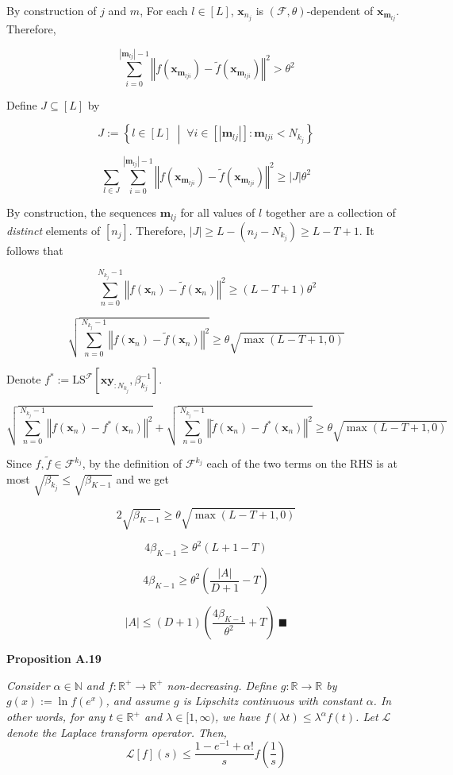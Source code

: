 \documentclass[a4paper]{article}
\newcommand{\Co}[1]{}
\newcommand{\AP}[1]{\left(#1\right)}
\newcommand{\AB}[1]{\left[#1\right]}
\newcommand{\ACM}[2]{\left\{#1\;\middle\vert\;#2\right\}}
\newcommand{\Abs}[1]{\left\vert #1 \right\vert}
\newcommand{\Norm}[1]{\left\Vert #1 \right\Vert}
\newcommand{\Nats}{\mathbb{N}}
\newcommand{\Reals}{\mathbb{R}}
\newcommand{\La}{\mathcal{L}}
\newcommand{\F}{\mathcal{F}}
\newcommand{\LS}{\mathrm{LS}}
\begin{document}
By construction of $j$ and $m$, For each $l\in[L]$, $\boldsymbol{x}_{n_j}$ is $(\F,\theta)$-dependent of $\boldsymbol{x}_{\boldsymbol{m}_{lj}}$. Therefore,

$$\sum_{i=0}^{\Abs{\boldsymbol{m}_{lj}}-1}\Norm{f\AP{\boldsymbol{x}_{\boldsymbol{m}_{lji}}}-\tilde{f}\AP{\boldsymbol{x}_{\boldsymbol{m}_{lji}}}}^2>\theta^2$$

Define $J\subseteq[L]$ by

$$J:=\ACM{l\in[L]}{\forall i\in\AB{\Abs{\boldsymbol{m}_{lj}}}: \boldsymbol{m}_{lji}<N_{k_j}}$$

$$\sum_{l\in J}\sum_{i=0}^{\Abs{\boldsymbol{m}_{lj}}-1}\Norm{f\AP{\boldsymbol{x}_{\boldsymbol{m}_{lji}}}-\tilde{f}\AP{\boldsymbol{x}_{\boldsymbol{m}_{lji}}}}^2\geq\Abs{J}\theta^2$$

By construction, the sequences $\boldsymbol{m}_{lj}$ for all values of $l$ together are a collection of \textit{distinct}\Co{i} elements of $\AB{n_j}$. Therefore, $\Abs{J}\geq L-\AP{n_j-N_{k_j}}\geq L-T+1$. It follows that

$$\sum_{n=0}^{N_{k_j}-1}\Norm{f\AP{\boldsymbol{x}_n}-\tilde{f}\AP{\boldsymbol{x}_n}}^2\geq(L-T+1)\theta^2$$

$$\sqrt{\sum_{n=0}^{N_{k_j}-1}\Norm{f\AP{\boldsymbol{x}_n}-\tilde{f}\AP{\boldsymbol{x}_n}}^2}\geq\theta\sqrt{\max(L-T+1,0)}$$

Denote $f^*:=\LS^\F\AB{\boldsymbol{xy}_{:N_{k_j}},\beta_{k_j}^{-1}}$.

$$\sqrt{\sum_{n=0}^{N_{k_j}-1}\Norm{f\AP{\boldsymbol{x}_n}-f^*\AP{\boldsymbol{x}_n}}^2}+\sqrt{\sum_{n=0}^{N_{k_j}-1}\Norm{\tilde{f}\AP{\boldsymbol{x}_n}-f^*\AP{\boldsymbol{x}_n}}^2}\geq\theta\sqrt{\max(L-T+1,0)}$$

Since $f,\tilde{f}\in\F^{k_j}$, by the definition of $\F^{k_j}$ each of the two terms on the RHS is at most $\sqrt{\beta_{k_j}}\leq\sqrt{\beta_{K-1}}$ and we get

$$2\sqrt{\beta_{K-1}} \geq\theta\sqrt{\max(L-T+1,0)}$$

$$4\beta_{K-1} \geq \theta^2(L+1-T)$$

$$4\beta_{K-1} \geq\theta^2\AP{\frac{\Abs{A}}{D+1}-T}$$

$$\Abs{A}\leq(D+1)\AP{\frac{4\beta_{K-1}}{\theta^2}+T}\ \blacksquare$$

\textbf{Proposition A.19}\Co{b}

\textit{Consider $\alpha\in\Nats$ and $f:\Reals^+\rightarrow\Reals^+$ non-decreasing. Define $g:\Reals\rightarrow\Reals$ by $g(x):=\ln{f\AP{e^x}}$, and assume $g$ is Lipschitz continuous with constant $\alpha$. In other words, for any $t\in\Reals^+$ and $\lambda\in[1,\infty)$, we have $f\AP{\lambda t}\leq\lambda^\alpha f(t)$. Let $\La$ denote the Laplace transform operator. Then,
}\Co{i}
$$\La[f](s)\leq\frac{1-e^{-1}+\alpha!}{s}f\AP{\frac{1}{s}}$$
\end{document}
